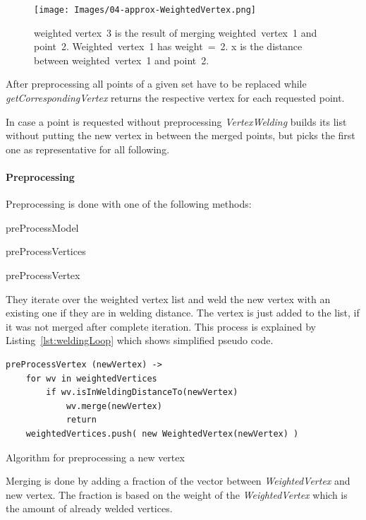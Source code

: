 \documentclass[../ClassicThesis.tex]{subfiles}
\begin{document}
\begin{figure}
\texttt{[image: Images/04-approx-WeightedVertex.png]}
\caption{weighted vertex~3 is the result of merging weighted~vertex~1 and point~2. Weighted~vertex~1 has weight~=~2. x is the distance between weighted~vertex~1 and point~2.}
\label{fig:weightedVertex}
\end{figure}

After preprocessing all points of a given set have to be replaced while \emph{getCorrespondingVertex} returns the respective vertex for each requested point.

In case a point is requested without preprocessing \emph{VertexWelding} builds its list without putting the new vertex in between the merged points, but picks the first one as representative for all following.




\paragraph{Preprocessing}

Preprocessing is done with one of the following methods:

\begin{description}
    \item preProcessModel
    \item preProcessVertices
    \item preProcessVertex
\end{description}

They iterate over the weighted vertex list and weld the new vertex with an existing one if they are in welding distance. The vertex is just added to the list, if it was not merged after complete iteration. This process is explained by Listing~\ref{lst:weldingLoop} which shows simplified pseudo code.

\begin{listing}[!h]
\centering
\begin{verbatim}
preProcessVertex (newVertex) ->
    for wv in weightedVertices
        if wv.isInWeldingDistanceTo(newVertex)
            wv.merge(newVertex)
            return
    weightedVertices.push( new WeightedVertex(newVertex) )
\end{verbatim}
\caption{Algorithm for preprocessing a new vertex}
\label{lst:weldingLoop}
\end{listing}

Merging is done by adding a fraction of the vector between \emph{WeightedVertex} and new vertex. The fraction is based on the weight of the \emph{WeightedVertex} which is the amount of already welded vertices.
\end{document}
